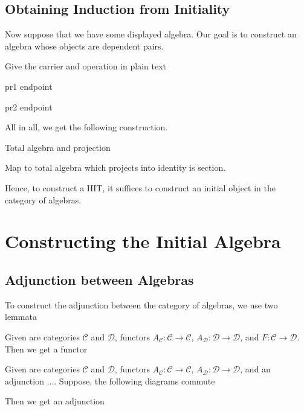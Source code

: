 \documentclass[9pt]{entcs}
\newcommand{\1}{\type{1}} %
\newcommand{\functor}[2]{#1 \rightarrow #2} %
\begin{document}
\subsection{Obtaining Induction from Initiality}
Now suppose that we have some displayed algebra.
Our goal is to construct an algebra whose objects are dependent pairs.

Give the carrier and operation in plain text

\begin{lemma}
pr1 endpoint
\end{lemma}

\begin{lemma}
pr2 endpoint
\end{lemma}

All in all, we get the following construction.

\begin{theorem}
Total algebra and projection
\end{theorem}

\begin{proposition}
Map to total algebra which projects into identity is section.
\end{proposition}

Hence, to construct a HIT, it suffices to construct an initial object in the category of algebras.

\begin{corollary}
	
\end{corollary}

\section{Constructing the Initial Algebra}

\subsection{Adjunction between Algebras}
To construct the adjunction between the category of algebras, we use two lemmata

\begin{lemma}
Given are categories $\mathcal{C}$ and $\mathcal{D}$, functors $A_{\mathcal{C}} : \functor{\mathcal{C}}{\mathcal{C}}$, $A_{\mathcal{D}} : \functor{\mathcal{D}}{\mathcal{D}}$, and $F : \functor{\mathcal{C}}{\mathcal{D}}$.
Then we get a functor 
\end{lemma}

\begin{lemma}
Given are categories $\mathcal{C}$ and $\mathcal{D}$, functors $A_{\mathcal{C}} : \functor{\mathcal{C}}{\mathcal{C}}$, $A_{\mathcal{D}} : \functor{\mathcal{D}}{\mathcal{D}}$, and an adjunction ....
Suppose, the following diagrams commute

Then we get an adjunction
\end{lemma}
\end{document}
